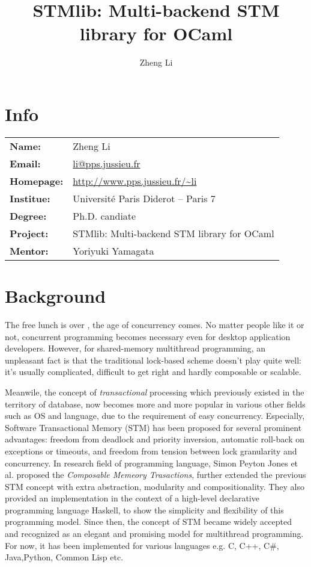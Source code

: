 \documentclass{article}
\title{STMlib: Multi-backend STM library for OCaml}
\author{Zheng Li}
\begin{document}
\maketitle

\section{Info}

\begin{center}
\begin{tabular}{ll}
\textbf{Name:} & Zheng Li\\
\textbf{Email:} & \url{li@pps.jussieu.fr}\\
\textbf{Homepage:} & \url{http://www.pps.jussieu.fr/~li}\\
\textbf{Institue:} & Universit\'e Paris Diderot -- Paris 7\\
\textbf{Degree:} & Ph.D. candiate\\
\textbf{Project:} & STMlib: Multi-backend STM library for OCaml\\
\textbf{Mentor:} & Yoriyuki Yamagata\\
\end{tabular}
\end{center}

\section{Background}

The free lunch is over \cite{FLO-Sutter-05}, the age of concurrency comes. No
matter people like it or not, concurrent programming becomes necessary even for
desktop application developers. However, for shared-memory multithread
programming, an unpleasant fact is that the traditional lock-based scheme
doesn't play quite well: it's usually complicated, difficult to get right and
hardly composable or scalable. 

Meanwile, the concept of \textit{transactional} processing which previously
existed in the territory of database,  now becomes more and more popular in
various other fields such as OS and language, due to the requirement of easy
concurrency.
Especially,  Software Transactional Memory (STM) has been proposed
\cite{STM-ShavitTouitou-95} for several prominent advantages: freedom from
deadlock and priority inversion,
automatic roll-back on exceptions or timeouts, and freedom from tension between
lock granularity and concurrency. In research field of programming language,
Simon Peyton Jones et al. proposed \cite{CMT-HMPJH-05}
the \emph{Composable Memeory Trasactions}, further extended the previous STM
concept with extra
abstraction, modularity and compositionality. They also provided an
implementation in the context of a high-level declarative programming
language Haskell, to show the simplicity and flexibility of this
programming model. Since then, the concept of STM became widely accepted
and recognized as an elegant and promising model for multithread
programming. For now, it has been implemented for various languages e.g. C,
C++, C\#, Java,Python, Common Lisp etc.
\end{document}

